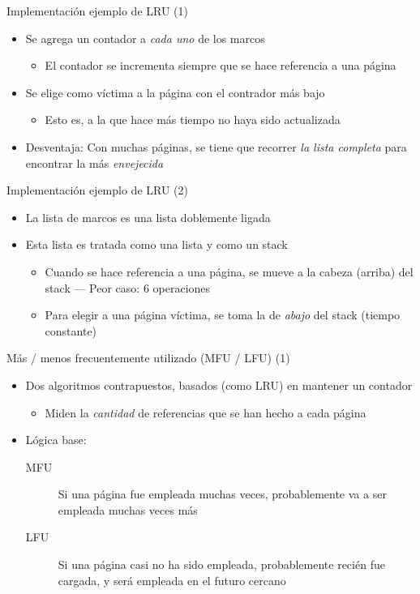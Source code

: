 \documentclass[presentation]{beamer}
\begin{document}
\begin{frame}[label={sec:orgd754142}]{Implementación ejemplo de LRU (1)}
\begin{itemize}
\item Se agrega un contador a \emph{cada uno} de los marcos
\begin{itemize}
\item El contador se incrementa siempre que se hace referencia a una
página
\end{itemize}
\item Se elige como víctima a la página con el contrador más bajo
\begin{itemize}
\item Esto es, a la que hace más tiempo no haya sido actualizada
\end{itemize}
\item Desventaja: Con muchas páginas, se tiene que recorrer \emph{la lista
completa} para encontrar la más \emph{envejecida}
\end{itemize}
\end{frame}

\begin{frame}[label={sec:orgc70b79b}]{Implementación ejemplo de LRU (2)}
\begin{itemize}
\item La lista de marcos es una lista doblemente ligada
\item Esta lista es tratada como una lista y como un stack
\begin{itemize}
\item Cuando se hace referencia a una página, se mueve a la cabeza
(arriba) del stack — Peor caso: 6 operaciones
\item Para elegir a una página víctima, se toma la de \emph{abajo} del stack
(tiempo constante)
\end{itemize}
\end{itemize}
\end{frame}

\begin{frame}[label={sec:orgffe59eb}]{Más / menos frecuentemente utilizado (MFU / LFU) (1)}
\begin{itemize}
\item Dos algoritmos contrapuestos, basados (como LRU) en mantener un
contador
\begin{itemize}
\item Miden la \emph{cantidad} de referencias que se han hecho a cada página
\end{itemize}
\item Lógica base:
\begin{description}
\item[{MFU}] Si una página fue empleada muchas veces, probablemente va a
ser empleada muchas veces más
\item[{LFU}] Si una página casi no ha sido empleada, probablemente
recién fue cargada, y será empleada en el futuro cercano
\end{description}
\end{itemize}
\end{frame}
\end{document}
